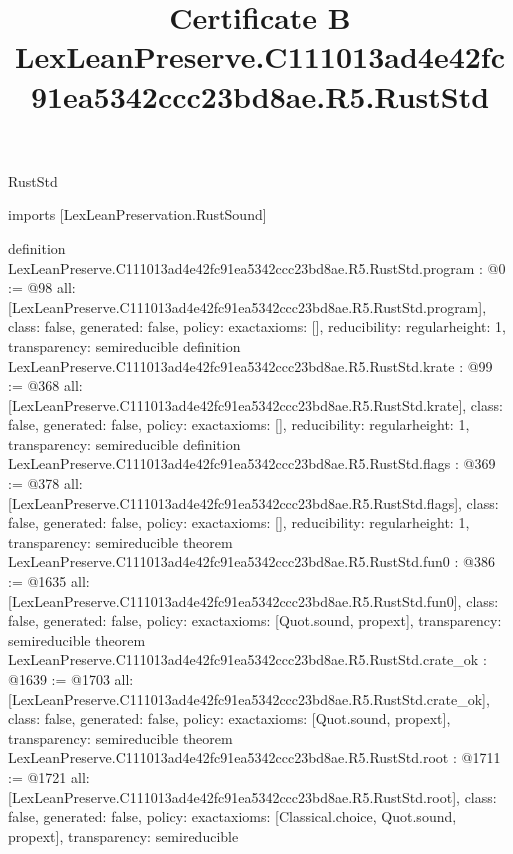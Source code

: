 \begin{lexlean}{RustStd}
\title{Certificate B LexLeanPreserve.C111013ad4e42fc91ea5342ccc23bd8ae.R5.RustStd}
\begin{coremodule}
imports [LexLeanPreservation.RustSound]

definition LexLeanPreserve.C111013ad4e42fc91ea5342ccc23bd8ae.R5.RustStd.program : @0 := @98 {
  all: [LexLeanPreserve.C111013ad4e42fc91ea5342ccc23bd8ae.R5.RustStd.program],
  class: false,
  generated: false,
  policy: exact{axioms: []},
  reducibility: regular{height: 1},
  transparency: semireducible
}
definition LexLeanPreserve.C111013ad4e42fc91ea5342ccc23bd8ae.R5.RustStd.krate : @99 := @368 {
  all: [LexLeanPreserve.C111013ad4e42fc91ea5342ccc23bd8ae.R5.RustStd.krate],
  class: false,
  generated: false,
  policy: exact{axioms: []},
  reducibility: regular{height: 1},
  transparency: semireducible
}
definition LexLeanPreserve.C111013ad4e42fc91ea5342ccc23bd8ae.R5.RustStd.flags : @369 := @378 {
  all: [LexLeanPreserve.C111013ad4e42fc91ea5342ccc23bd8ae.R5.RustStd.flags],
  class: false,
  generated: false,
  policy: exact{axioms: []},
  reducibility: regular{height: 1},
  transparency: semireducible
}
theorem LexLeanPreserve.C111013ad4e42fc91ea5342ccc23bd8ae.R5.RustStd.fun0 : @386 := @1635 {
  all: [LexLeanPreserve.C111013ad4e42fc91ea5342ccc23bd8ae.R5.RustStd.fun0],
  class: false,
  generated: false,
  policy: exact{axioms: [Quot.sound, propext]},
  transparency: semireducible
}
theorem LexLeanPreserve.C111013ad4e42fc91ea5342ccc23bd8ae.R5.RustStd.crate_ok : @1639 := @1703 {
  all: [LexLeanPreserve.C111013ad4e42fc91ea5342ccc23bd8ae.R5.RustStd.crate_ok],
  class: false,
  generated: false,
  policy: exact{axioms: [Quot.sound, propext]},
  transparency: semireducible
}
theorem LexLeanPreserve.C111013ad4e42fc91ea5342ccc23bd8ae.R5.RustStd.root : @1711 := @1721 {
  all: [LexLeanPreserve.C111013ad4e42fc91ea5342ccc23bd8ae.R5.RustStd.root],
  class: false,
  generated: false,
  policy: exact{axioms: [Classical.choice, Quot.sound, propext]},
  transparency: semireducible
}


\end{coremodule}
\end{lexlean}
